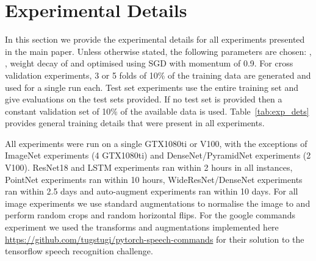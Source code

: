 \documentclass[journal]{IEEEtran}
\begin{document}
\appendices
\section{Experimental Details}\label{app:experimental_details}
In this section we provide the experimental details for all experiments presented in the main paper. Unless otherwise stated, the following parameters are chosen: , , weight decay of  and optimised using SGD with momentum of 0.9. For cross validation experiments, 3 or 5 folds of 10\% of the training data are generated and used for a single run each. Test set experiments use the entire training set and give evaluations on the test sets provided. If no test set is provided then a constant validation set of 10\% of the available data is used. Table~\ref{tab:exp_dets} provides general training details that were present in all experiments.



All experiments were run on a single GTX1080ti or V100, with the exceptions of ImageNet experiments (4  GTX1080ti) and DenseNet/PyramidNet experiments (2  V100). ResNet18 and LSTM experiments ran within 2 hours in all instances, PointNet experiments ran within 10 hours, WideResNet/DenseNet experiments ran within 2.5 days and auto-augment experiments ran within 10 days.
For all image experiments we use standard augmentations to normalise the image to  and perform random crops and random horizontal flips. For the google commands experiment we used the transforms and augmentations implemented here \url{https://github.com/tugstugi/pytorch-speech-commands} for their solution to the tensorflow speech recognition challenge. 
\end{document}
